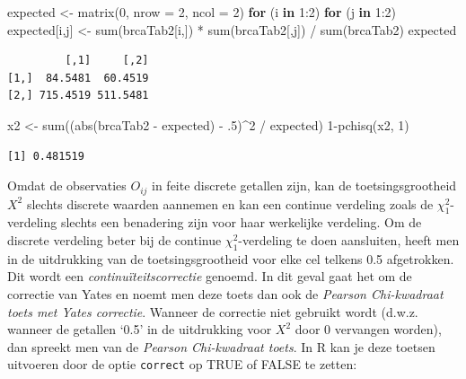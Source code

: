\documentclass[
  dutch,
  letterpaper,
  12pt]{book}
\newenvironment{Shaded}{\begin{snugshade}}{\end{snugshade}}
\newcommand{\AttributeTok}[1]{\textcolor[rgb]{0.40,0.45,0.13}{#1}}
\newcommand{\ControlFlowTok}[1]{\textcolor[rgb]{0.00,0.23,0.31}{\textbf{#1}}}
\newcommand{\DecValTok}[1]{\textcolor[rgb]{0.68,0.00,0.00}{#1}}
\newcommand{\FunctionTok}[1]{\textcolor[rgb]{0.28,0.35,0.67}{#1}}
\newcommand{\NormalTok}[1]{\textcolor[rgb]{0.00,0.23,0.31}{#1}}
\newcommand{\OtherTok}[1]{\textcolor[rgb]{0.00,0.23,0.31}{#1}}
\newcommand{\SpecialCharTok}[1]{\textcolor[rgb]{0.37,0.37,0.37}{#1}}
\theoremstyle{definition}
\theoremstyle{definition}
\theoremstyle{definition}
\theoremstyle{remark}
\begin{document}
\begin{Shaded}
\begin{Highlighting}[]
\NormalTok{expected }\OtherTok{\textless{}{-}} \FunctionTok{matrix}\NormalTok{(}\DecValTok{0}\NormalTok{, }\AttributeTok{nrow =} \DecValTok{2}\NormalTok{, }\AttributeTok{ncol =} \DecValTok{2}\NormalTok{)}
\ControlFlowTok{for}\NormalTok{ (i }\ControlFlowTok{in} \DecValTok{1}\SpecialCharTok{:}\DecValTok{2}\NormalTok{)}
    \ControlFlowTok{for}\NormalTok{ (j }\ControlFlowTok{in} \DecValTok{1}\SpecialCharTok{:}\DecValTok{2}\NormalTok{)}
\NormalTok{        expected[i,j] }\OtherTok{\textless{}{-}} \FunctionTok{sum}\NormalTok{(brcaTab2[i,]) }\SpecialCharTok{*} \FunctionTok{sum}\NormalTok{(brcaTab2[,j]) }\SpecialCharTok{/} \FunctionTok{sum}\NormalTok{(brcaTab2)}
\NormalTok{expected}
\end{Highlighting}
\end{Shaded}

\begin{verbatim}
         [,1]     [,2]
[1,]  84.5481  60.4519
[2,] 715.4519 511.5481
\end{verbatim}

\begin{Shaded}
\begin{Highlighting}[]
\NormalTok{x2 }\OtherTok{\textless{}{-}} \FunctionTok{sum}\NormalTok{((}\FunctionTok{abs}\NormalTok{(brcaTab2 }\SpecialCharTok{{-}}\NormalTok{ expected) }\SpecialCharTok{{-}}\NormalTok{ .}\DecValTok{5}\NormalTok{)}\SpecialCharTok{\^{}}\DecValTok{2} \SpecialCharTok{/}\NormalTok{ expected)}
\DecValTok{1}\SpecialCharTok{{-}}\FunctionTok{pchisq}\NormalTok{(x2, }\DecValTok{1}\NormalTok{)}
\end{Highlighting}
\end{Shaded}

\begin{verbatim}
[1] 0.481519
\end{verbatim}

Omdat de observaties \(O_{ij}\) in feite discrete getallen zijn, kan de
toetsingsgrootheid \(X^2\) slechts discrete waarden aannemen en kan een
continue verdeling zoals de \(\chi^2_1\)-verdeling slechts een
benadering zijn voor haar werkelijke verdeling. Om de discrete verdeling
beter bij de continue \(\chi^2_1\)-verdeling te doen aansluiten, heeft
men in de uitdrukking van de toetsingsgrootheid voor elke cel telkens
0.5 afgetrokken. Dit wordt een \emph{continuïteitscorrectie} genoemd. In
dit geval gaat het om de correctie van Yates en noemt men deze toets dan
ook de \emph{Pearson Chi-kwadraat toets met Yates correctie}. Wanneer de
correctie niet gebruikt wordt (d.w.z. wanneer de getallen `0.5' in de
uitdrukking voor \(X^2\) door 0 vervangen worden), dan spreekt men van
de \emph{Pearson Chi-kwadraat toets}. In R kan je deze toetsen uitvoeren
door de optie \texttt{correct} op TRUE of FALSE te zetten:
\end{document}
